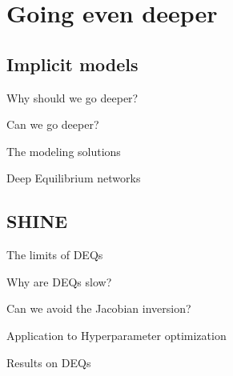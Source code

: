 \section{Going even deeper}
\subsection{Implicit models}

\begin{frame}{Why should we go deeper?}
\end{frame}

\begin{frame}{Can we go deeper?}
\end{frame}

\begin{frame}{The modeling solutions}
\end{frame}

\begin{frame}{Deep Equilibrium networks}
\end{frame}

\subsection{SHINE}
\begin{frame}{The limits of DEQs}
\end{frame}

\begin{frame}{Why are DEQs slow?}
\end{frame}

\begin{frame}{Can we avoid the Jacobian inversion?}
\end{frame}

\begin{frame}{Application to Hyperparameter optimization}
\end{frame}

\begin{frame}{Results on DEQs}

\end{frame}